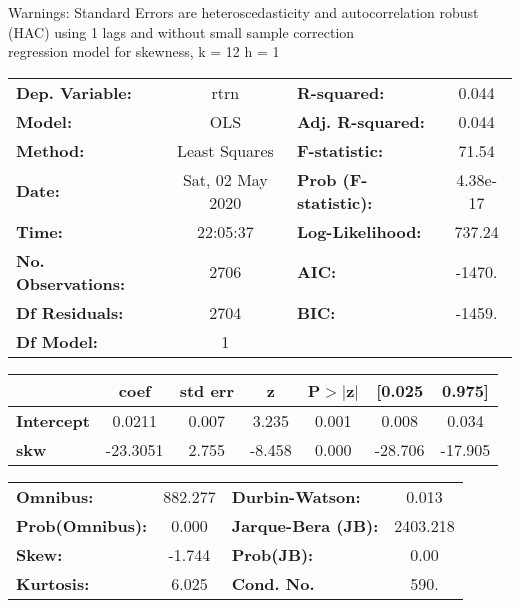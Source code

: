 Warnings: \newline
 [1] Standard Errors are heteroscedasticity and autocorrelation robust (HAC) using 1 lags and without small sample correction\\ 

regression model for skewness, k = 12 h = 1\begin{center}
\begin{tabular}{lclc}
\toprule
\textbf{Dep. Variable:}    &       rtrn       & \textbf{  R-squared:         } &     0.044   \\
\textbf{Model:}            &       OLS        & \textbf{  Adj. R-squared:    } &     0.044   \\
\textbf{Method:}           &  Least Squares   & \textbf{  F-statistic:       } &     71.54   \\
\textbf{Date:}             & Sat, 02 May 2020 & \textbf{  Prob (F-statistic):} &  4.38e-17   \\
\textbf{Time:}             &     22:05:37     & \textbf{  Log-Likelihood:    } &    737.24   \\
\textbf{No. Observations:} &        2706      & \textbf{  AIC:               } &    -1470.   \\
\textbf{Df Residuals:}     &        2704      & \textbf{  BIC:               } &    -1459.   \\
\textbf{Df Model:}         &           1      & \textbf{                     } &             \\
\bottomrule
\end{tabular}
\begin{tabular}{lcccccc}
                   & \textbf{coef} & \textbf{std err} & \textbf{z} & \textbf{P$> |$z$|$} & \textbf{[0.025} & \textbf{0.975]}  \\
\midrule
\textbf{Intercept} &       0.0211  &        0.007     &     3.235  &         0.001        &        0.008    &        0.034     \\
\textbf{skw}       &     -23.3051  &        2.755     &    -8.458  &         0.000        &      -28.706    &      -17.905     \\
\bottomrule
\end{tabular}
\begin{tabular}{lclc}
\textbf{Omnibus:}       & 882.277 & \textbf{  Durbin-Watson:     } &    0.013  \\
\textbf{Prob(Omnibus):} &   0.000 & \textbf{  Jarque-Bera (JB):  } & 2403.218  \\
\textbf{Skew:}          &  -1.744 & \textbf{  Prob(JB):          } &     0.00  \\
\textbf{Kurtosis:}      &   6.025 & \textbf{  Cond. No.          } &     590.  \\
\bottomrule
\end{tabular}
\end{center}

